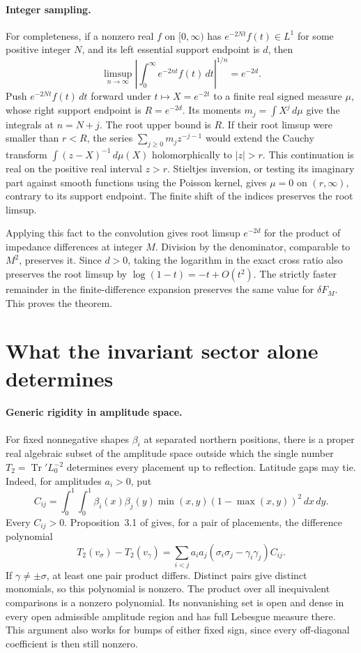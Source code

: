 \documentclass[11pt,letterpaper]{article}
\begin{document}
\paragraph{Integer sampling.}
For completeness, if a nonzero real \(f\) on \([0,\infty)\) has
\(e^{-2Nt}f(t)\in L^1\) for some positive integer \(N\), and its
left essential support endpoint is \(d\), then
\[
 \limsup_{n\to\infty}
 \left|\int_0^\infty e^{-2nt}f(t)\,dt\right|^{1/n}=e^{-2d}.
\]
Push \(e^{-2Nt}f(t)\,dt\) forward under \(t\mapsto X=e^{-2t}\)
to a finite real signed measure \(\mu\), whose right support
endpoint is \(R=e^{-2d}\). Its moments \(m_j=\int X^j\,d\mu\)
give the integrals at \(n=N+j\). The root upper bound is \(R\).
If their root limsup were smaller than \(r<R\), the series
\(\sum_{j\geq0}m_j z^{-j-1}\) would extend the Cauchy transform
\(\int (z-X)^{-1}\,d\mu(X)\) holomorphically to \(|z|>r\).
This continuation is real on the positive real interval \(z>r\).
Stieltjes inversion, or testing its imaginary part against smooth
functions using the Poisson kernel, gives \(\mu=0\) on \((r,\infty)\),
contrary to its support endpoint. The finite shift of the indices
preserves the root limsup.

Applying this fact to the convolution gives root limsup \(e^{-2d}\)
for the product of impedance differences at integer \(M\).
Division by the denominator, comparable to \(M^2\), preserves it.
Since \(d>0\), taking the logarithm in the exact cross ratio
also preserves the root limsup by \(\log(1-t)=-t+O(t^2)\).
The strictly faster remainder in the finite-difference expansion
preserves the same value for \(\delta F_M\). This proves the theorem.

\section{What the invariant sector alone determines}

\paragraph{Generic rigidity in amplitude space.}
For fixed nonnegative shapes \(\beta_i\) at separated northern positions,
there is a proper real algebraic subset of the amplitude space outside
which the single number \(T_2=\operatorname{Tr}' L_0^{-2}\)
determines every placement up to reflection. Latitude gaps may tie.
Indeed, for amplitudes \(a_i>0\), put
\[
 C_{ij}=\int_0^1\!\!\int_0^1 \beta_i(x)\beta_j(y)
          \min(x,y)(1-\max(x,y))^2\,dx\,dy .
\]
Every \(C_{ij}>0\). Proposition~3.1 of \cite{original} gives, for a
pair of placements, the difference polynomial
\[
 T_2(v_\sigma)-T_2(v_\gamma)=
 \sum_{i<j} a_i a_j
    (\sigma_i\sigma_j-\gamma_i\gamma_j) C_{ij}.
\]
If \(\gamma\ne\pm\sigma\), at least one pair product differs.
Distinct pairs give distinct monomials, so this polynomial is nonzero.
The product over all inequivalent comparisons is a nonzero polynomial.
Its nonvanishing set is open and dense in every open admissible amplitude
region and has full Lebesgue measure there.
This argument also works for bumps of either fixed sign, since every
off-diagonal coefficient is then still nonzero.
\end{document}
